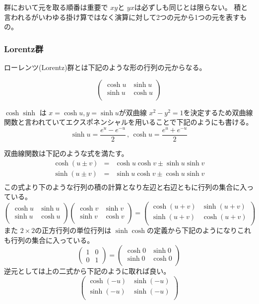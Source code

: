\documentclass[dvipdfmx]{jsarticle}
\begin{document}
群において元を取る順番は重要で $xy$と $yx$は必ずしも同じとは限らない。
積と言われるがいわゆる掛け算ではなく演算に対して2つの元から1つの元を表すもの。

\subsubsection{Lorentz群}
ローレンツ(Lorentz)群とは下記のような形の行列の元からなる。

\[
\begin{pmatrix}
    \cosh u & \sinh u \\
    \sinh u & \cosh u \\
\end{pmatrix}
\]

$ \cosh \sinh $ は $x = \cosh u , y = \sinh u $が双曲線 $x^2 - y^2 = 1$を決定するため双曲線関数と言われていてエクスポネンシャルを用いることで下記のようにも書ける。
\[
  \sinh u = \frac{e^u - e^{-u}}{2} \, , \, \cosh u = \frac{e^u + e^{-u}}{2}
\]

双曲線関数は下記のような式を満たす。
\begin{eqnarray*}
  \cosh (u \pm v) & = & \cosh u \cosh v \pm \sinh u \sinh v \\
  \sinh (u \pm v) & = & \sinh u \cosh v \pm \cosh u \sinh v \\
\end{eqnarray*}
この式より下のような行列の積の計算となり左辺と右辺ともに行列の集合に入っている。
\[
\begin{pmatrix}
  \cosh u & \sinh u \\
  \sinh u & \cosh u \\
\end{pmatrix}
\begin{pmatrix}
  \cosh v & \sinh v \\
  \sinh v & \cosh v \\
\end{pmatrix}
=
\begin{pmatrix}
  \cosh (u + v) & \sinh (u + v) \\
  \sinh (u + v) & \cosh (u + v) \\
\end{pmatrix}
\]
また $2 \times 2$の正方行列の単位行列は $\sinh \cosh$の定義から下記のようになりこれも行列の集合に入っている。
\[
\begin{pmatrix}
  1 & 0 \\
  0 & 1
\end{pmatrix}
=
\begin{pmatrix}
  \cosh 0 & \sinh 0 \\
  \sinh 0 & \cosh 0 \\
\end{pmatrix}
\]
逆元としては上の二式から下記のように取れば良い。
\[
\begin{pmatrix}
  \cosh (-u) & \sinh (-u) \\
  \sinh (-u) & \sinh (-u) \\
\end{pmatrix}
\]
\end{document}
